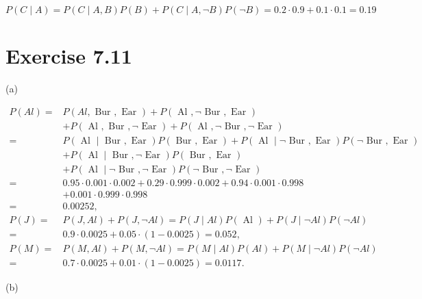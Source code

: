 \documentclass[10pt]{book}
\begin{document}
\begin{center}
\begin{enumerate}
\begin{center}
\begin{center}
\begin{center}
\begin{center}
\begin{center}
$$
P(C \mid A)=P(C \mid A, B) P(B)+P(C \mid A, \neg B) P(\neg B)=0.2 \cdot 0.9+0.1 \cdot 0.1=0.19
$$

\section*{Exercise 7.11}
(a)

$$
\begin{aligned}
P(A l)= & P(A l, \text { Bur }, \text { Ear })+P(\text { Al }, \neg \text { Bur }, \text { Ear }) \\
& +P(\text { Al }, \text { Bur }, \neg \text { Ear })+P(\text { Al }, \neg \text { Bur }, \neg \text { Ear }) \\
= & P(\text { Al } \mid \text { Bur }, \text { Ear }) P(\text { Bur }, \text { Ear })+P(\text { Al } \mid \neg \text { Bur }, \text { Ear }) P(\neg \text { Bur }, \text { Ear }) \\
& +P(\text { Al } \mid \text { Bur }, \neg \text { Ear }) P(\text { Bur }, \text { Ear }) \\
& +P(\text { Al } \mid \neg \text { Bur }, \neg \text { Ear }) P(\neg \text { Bur }, \neg \text { Ear }) \\
= & 0.95 \cdot 0.001 \cdot 0.002+0.29 \cdot 0.999 \cdot 0.002+0.94 \cdot 0.001 \cdot 0.998 \\
& +0.001 \cdot 0.999 \cdot 0.998 \\
= & 0.00252, \\
P(J)= & P(J, A l)+P(J, \neg A l)=P(J \mid A l) P(\text { Al })+P(J \mid \neg A l) P(\neg A l) \\
= & 0.9 \cdot 0.0025+0.05 \cdot(1-0.0025)=0.052, \\
P(M)= & P(M, A l)+P(M, \neg A l)=P(M \mid A l) P(A l)+P(M \mid \neg A l) P(\neg A l) \\
= & 0.7 \cdot 0.0025+0.01 \cdot(1-0.0025)=0.0117 .
\end{aligned}
$$

(b)


\end{center}
\end{center}
\end{center}
\end{center}
\end{center}
\end{enumerate}
\end{center}
\end{document}
